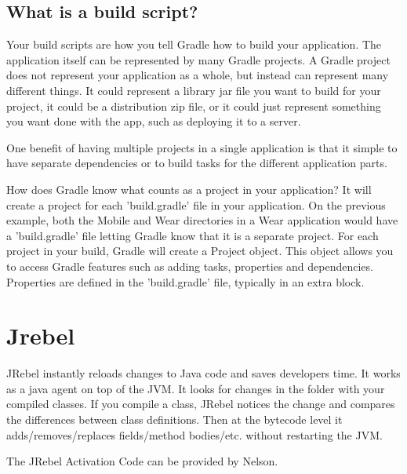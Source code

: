 \documentclass[oneside]{book}
\begin{document}
\subsection{What is a build script?}
Your build scripts are how you tell Gradle how to build your application. The application itself can be represented by many Gradle projects. A Gradle project does not represent your application as a whole, but instead can represent many different things. It could represent a library jar file you want to build for your project, it could be a distribution zip file, or it could just represent something you want done with the app, such as deploying it to a server.\par
One benefit of having multiple projects in a single application is that it simple to have separate dependencies or to build tasks for the different application parts.\par
How does Gradle know what counts as a project in your application? It will create a project for each 'build.gradle' file in your application. On the previous example, both the Mobile and Wear directories in a Wear application would have a 'build.gradle' file letting Gradle know that it is a separate project. For each project in your build, Gradle will create a Project object. This object allows you to access Gradle features such as adding tasks, properties and dependencies. Properties are defined in the 'build.gradle' file, typically in an extra block.
\section{Jrebel}
JRebel instantly reloads changes to Java code and saves developers time. It works as a java agent on top of the JVM. It looks for changes in the folder with your compiled classes. If you compile a class, JRebel notices the change and compares the differences between class definitions. Then at the bytecode level it adds/removes/replaces fields/method bodies/etc. without restarting the JVM.\par
The JRebel Activation Code can be provided by Nelson.
\end{document}
